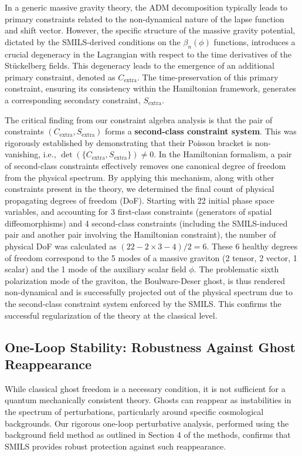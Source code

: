 \documentclass[twocolumn]{aastex631}
\begin{document}
In a generic massive gravity theory, the ADM decomposition typically leads to primary constraints related to the non-dynamical nature of the lapse function and shift vector. However, the specific structure of the massive gravity potential, dictated by the SMILS-derived conditions on the $\beta_n(\phi)$ functions, introduces a crucial degeneracy in the Lagrangian with respect to the time derivatives of the Stückelberg fields. This degeneracy leads to the emergence of an additional primary constraint, denoted as $C_{\text{extra}}$. The time-preservation of this primary constraint, ensuring its consistency within the Hamiltonian framework, generates a corresponding secondary constraint, $S_{\text{extra}}$.

The critical finding from our constraint algebra analysis is that the pair of constraints $(C_{\text{extra}}, S_{\text{extra}})$ forms a \textbf{second-class constraint system}. This was rigorously established by demonstrating that their Poisson bracket is non-vanishing, i.e., $\det(\{C_{\text{extra}}, S_{\text{extra}}\}) \neq 0$. In the Hamiltonian formalism, a pair of second-class constraints effectively removes one canonical degree of freedom from the physical spectrum. By applying this mechanism, along with other constraints present in the theory, we determined the final count of physical propagating degrees of freedom (DoF). Starting with 22 initial phase space variables, and accounting for 3 first-class constraints (generators of spatial diffeomorphisms) and 4 second-class constraints (including the SMILS-induced pair and another pair involving the Hamiltonian constraint), the number of physical DoF was calculated as $(22 - 2 \times 3 - 4) / 2 = 6$. These 6 healthy degrees of freedom correspond to the 5 modes of a massive graviton (2 tensor, 2 vector, 1 scalar) and the 1 mode of the auxiliary scalar field $\phi$. The problematic sixth polarization mode of the graviton, the Boulware-Deser ghost, is thus rendered non-dynamical and is successfully projected out of the physical spectrum due to the second-class constraint system enforced by the SMILS. This confirms the successful regularization of the theory at the classical level.

\subsection{One-Loop Stability: Robustness Against Ghost Reappearance}
While classical ghost freedom is a necessary condition, it is not sufficient for a quantum mechanically consistent theory. Ghosts can reappear as instabilities in the spectrum of perturbations, particularly around specific cosmological backgrounds. Our rigorous one-loop perturbative analysis, performed using the background field method as outlined in Section 4 of the methods, confirms that SMILS provides robust protection against such reappearance.
\end{document}
